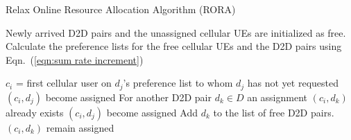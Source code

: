 \documentclass[times]{dacauth}
\begin{document}
\par
 \begin{algorithm}	
   \caption{Relax Online Resource Allocation Algorithm (RORA) }
   \label{algorthm2}
    \begin{algorithmic}[1]

       \State Newly arrived D2D pairs and the unassigned cellular UEs are initialized as free.  
        \State Calculate the preference lists for the free cellular UEs and the D2D pairs using Eqn.~(\ref{eqn:sum rate increment})
			
		
			\State $c_i$ = first cellular user on $d_j$'s preference list to whom $d_j$ has not yet requested
				\State $(c_i,d_j)$ become assigned
			\Else
				\State For another D2D pair $d_k \in D$ an assignment $(c_i, d_k)$ already exists 
					\State $(c_i, d_j)$ become assigned
					\State Add $d_k$ to the list of free D2D pairs.
				\Else
					\State $(c_i, d_k)$ remain assigned
				\EndIf
			\EndIf
		\EndWhile      	
	\EndProcedure

\end{algorithmic}
\end{algorithm}
\end{document}
